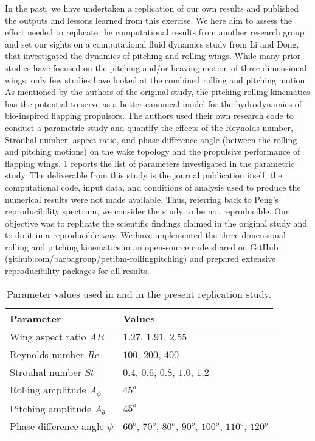 In the past, we have undertaken a replication of our own results\supercite{krishnan_et_al_2014} and published the outputs and lessons learned from this exercise.\supercite{mesnard_barba_2017}
We here aim to assess the effort needed to replicate the computational results from another research group and set our sights on a computational fluid dynamics study from Li and Dong,\supercite{li_dong_2016} that investigated the dynamics of pitching and rolling wings.
While many prior studies have focused on the pitching and/or heaving motion of three-dimensional wings, only few studies have looked at the combined rolling and pitching motion.
As mentioned by the authors of the original study, the pitching-rolling kinematics has the potential to serve as a better canonical model for the hydrodynamics of bio-inspired flapping propulsors.
The authors used their own research code to conduct a parametric study and quantify the effects of the Reynolds number, Strouhal number, aspect ratio, and phase-difference angle (between the rolling and pitching motions) on the wake topology and the propulsive performance of flapping wings.
\cref{tab:parameters} reports the list of parameters investigated in the parametric study.
The deliverable from this study is the journal publication itself; the computational code, input data, and conditions of analysis used to produce the numerical results were not made available.
Thus, referring back to Peng's reproducibility spectrum, we consider the study to be not reproducible.
Our objective was to replicate the scientific findings claimed in the original study and to do it in a reproducible way.
We have implemented the three-dimensional rolling and pitching kinematics in an open-source code shared on GitHub (\url{github.com/barbagroup/petibm-rollingpitching}) and prepared extensive reproducibility packages for all results.

\begin{table}%
  \centering
  \begin{tabular}{ll}
    \hline\hline
    Parameter & Values \\
    \hline
    Wing aspect ratio $AR$ & $1.27$, $1.91$, $2.55$ \\
    Reynolds number $Re$ & $100$, $200$, $400$ \\
    Strouhal number $St$ & $0.4$, $0.6$, $0.8$, $1.0$, $1.2$ \\
    Rolling amplitude $A_\phi$ & $45^o$ \\
    Pitching amplitude $A_\theta$ & $45^o$ \\
    Phase-difference angle $\psi$ & $60^o$, $70^o$, $80^o$, $90^o$, $100^o$, $110^o$, $120^o$ \\
    \hline\hline
  \end{tabular}
  \caption{Parameter values used in \citet{li_dong_2016} and in the present replication study.}
  \label{tab:parameters}
\end{table}

